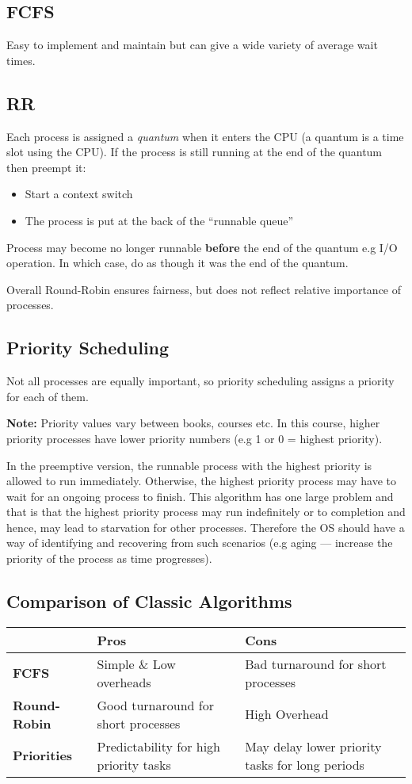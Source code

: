 \documentclass{article}
\begin{document}
\subsection{FCFS}
Easy to implement and maintain but can give a wide variety of average wait times.

\subsection{RR}
Each process is assigned a \textit{quantum} when it enters the CPU (a quantum is a time slot using the CPU).
If the process is still running at the end of the quantum then preempt it:
\begin{itemize}
	\item Start a context switch
	\item The process is put at the back of the ``runnable queue''
\end{itemize}
Process may become no longer runnable \textbf{before} the end of the quantum e.g I/O operation.
In which case, do as though it was the end of the quantum.

Overall Round-Robin ensures fairness, but does not reflect relative importance of processes.

\subsection{Priority Scheduling}
Not all processes are equally important, so priority scheduling assigns a priority for each of them.

\medskip
\textbf{Note:} Priority values vary between books, courses etc.
In this course, higher priority processes have lower priority numbers (e.g 1 or 0 = highest priority).

\medskip
In the preemptive version, the runnable process with the highest priority is allowed to run immediately.
Otherwise, the highest priority process may have to wait for an ongoing process to finish.
This algorithm has one large problem and that is that the highest priority process may run indefinitely or to completion and hence, may lead to starvation for other processes.
Therefore the OS should have a way of identifying and recovering from such scenarios (e.g aging --- increase the priority of the process as time progresses).

\subsection{Comparison of Classic Algorithms}
\begin{center}
	\begin{tabular}{|m{5em}|m{12em}|m{12em}|}
\hline
& Pros & Cons \\
\hline
\textbf{FCFS} & Simple \& Low overheads & Bad turnaround for short processes \\
\hline
\textbf{Round-Robin} &
Good turnaround for short processes & High Overhead \\
\hline
\textbf{Priorities} & Predictability for high priority tasks & May delay lower priority tasks for long periods \\
\hline
\end{tabular}
\end{center}
\end{document}
